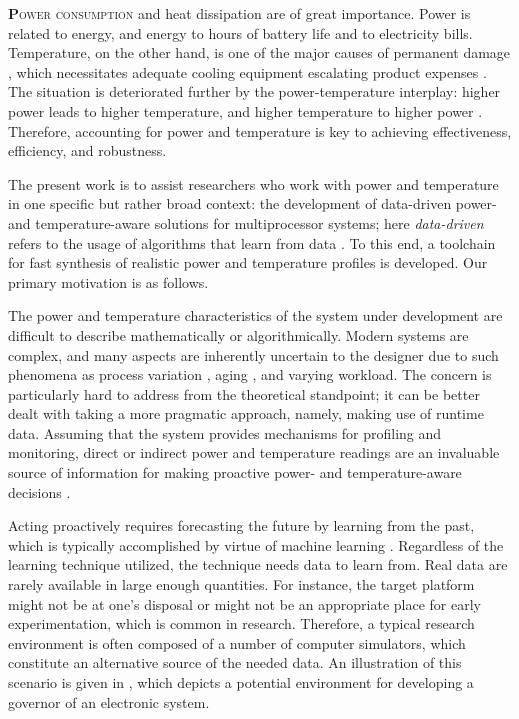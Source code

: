 \lettrine[findent=0.3em, nindent=0em]{\textbf{P}}{ower consumption} and heat
dissipation are of great importance. Power is related to energy, and energy to
hours of battery life and to electricity bills. Temperature, on the other hand,
is one of the major causes of permanent damage \cite{jedec}, which necessitates
adequate cooling equipment escalating product expenses \cite{chaudhry2015}. The
situation is deteriorated further by the power-temperature interplay: higher
power leads to higher temperature, and higher temperature to higher power
\cite{liu2007}. Therefore, accounting for power and temperature is key to
achieving effectiveness, efficiency, and robustness.

The present work is to assist researchers who work with power and temperature in
one specific but rather broad context: the development of data-driven power- and
temperature-aware solutions for multiprocessor systems; here \emph{data-driven}
refers to the usage of algorithms that learn from data \cite{bishop2006}. To
this end, a toolchain for fast synthesis of realistic power and temperature
profiles is developed. Our primary motivation is as follows.

The power and temperature characteristics of the system under development are
difficult to describe mathematically or algorithmically. Modern systems are
complex, and many aspects are inherently uncertain to the designer due to such
phenomena as process variation \cite{chandrakasan2000}, aging \cite{coskun2006},
and varying workload. The concern is particularly hard to address from the
theoretical standpoint; it can be better dealt with taking a more pragmatic
approach, namely, making use of runtime data. Assuming that the system provides
mechanisms for profiling and monitoring, direct or indirect power and
temperature readings are an invaluable source of information for making
proactive power- and temperature-aware decisions \cite{chaudhry2015,
coskun2008}.


Acting proactively requires forecasting the future by learning from the past,
which is typically accomplished by virtue of machine learning \cite{bishop2006}.
Regardless of the learning technique utilized, the technique needs data to learn
from. Real data are rarely available in large enough quantities. For instance,
the target platform might not be at one's disposal or might not be an
appropriate place for early experimentation, which is common in research.
Therefore, a typical research environment is often composed of a number of
computer simulators, which constitute an alternative source of the needed data.
An illustration of this scenario is given in , which depicts a
potential environment for developing a governor of an electronic system.

